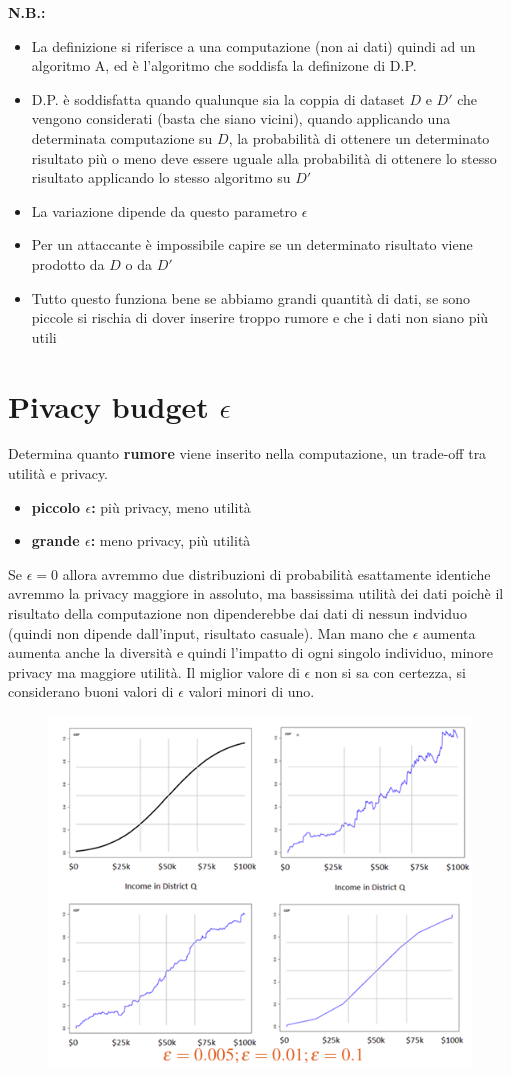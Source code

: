 \documentclass{report}
\begin{document}
\textbf{N.B.:} 
\begin{itemize}
    \item La definizione si riferisce a una computazione (non ai dati) quindi ad un algoritmo A, ed è l'algoritmo che soddisfa la definizone di D.P.
    \item D.P. è soddisfatta quando qualunque sia la coppia di dataset $D$ e $D'$ che vengono considerati (basta che siano vicini), quando applicando
    una determinata computazione su $D$, la probabilità di ottenere un determinato risultato più o meno deve essere uguale alla probabilità di ottenere lo stesso
    risultato applicando lo stesso algoritmo su $D'$
    \item La variazione dipende da questo parametro $\epsilon$
    \item Per un attaccante è impossibile capire se un determinato risultato viene prodotto da $D$ o da $D'$
    \item Tutto questo funziona bene se abbiamo grandi quantità di dati, se sono piccole si rischia di dover inserire troppo rumore e che i dati non siano più utili
\end{itemize}

\section{Pivacy budget $\epsilon$}
Determina quanto  \textbf{rumore} viene inserito nella computazione, un trade-off tra utilità e privacy.
\begin{itemize}
    \item \textbf{piccolo $\epsilon$:} più privacy, meno utilità
    \item \textbf{grande $\epsilon$:} meno privacy, più utilità
\end{itemize}

\noindent Se $\epsilon = 0$ allora avremmo due distribuzioni di probabilità esattamente identiche
avremmo la privacy maggiore in assoluto, ma bassissima utilità dei dati poichè il risultato della computazione non dipenderebbe dai dati di nessun indviduo (quindi non dipende dall'input, risultato casuale).
Man mano che $\epsilon$ aumenta aumenta anche la diversità e quindi l'impatto di ogni singolo individuo, minore privacy ma maggiore utilità.
Il miglior valore di $\epsilon$ non si sa con certezza, si considerano buoni valori di $\epsilon$ valori minori di uno. 
\begin{figure}[H]
        \centering
        \includegraphics[width=0.4\linewidth]{images/curve.png}
    \end{figure}
\end{document}
